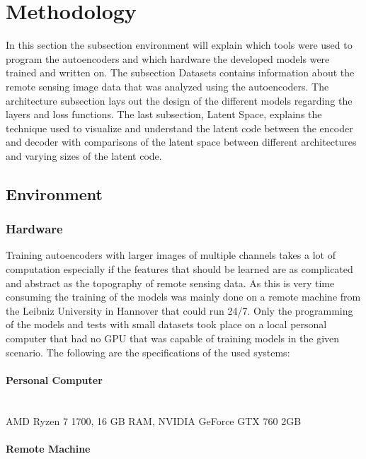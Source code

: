 \section{Methodology}

In this section the subsection environment will explain which tools were used to program the autoencoders
and which hardware the developed models were trained and written on. The subsection Datasets 
contains information about the remote sensing image data that was analyzed using the autoencoders. 
The architecture subsection lays out 
the design of the different models regarding the layers and loss functions. The last subsection, 
Latent Space, explains the technique used to visualize and understand the latent code between the 
encoder and decoder with comparisons of the latent space between different architectures and varying
sizes of the latent code.

\subsection{Environment}

\subsubsection{Hardware} \label{hardware}

Training autoencoders with larger images of multiple channels takes a lot of computation especially if the 
features that should be learned are as complicated and abstract as the topography of remote sensing data.
As this is very time consuming the training of the models was mainly done on a remote machine from the
Leibniz University in Hannover that could run 24/7. Only the
programming of the models and tests with small datasets took place on a local personal computer that had no
GPU that was capable of training models in the given scenario. The following
are the specifications of the used systems:\\

\paragraph{Personal Computer} \mbox{} \smallskip \\

AMD Ryzen 7 1700, 16 GB RAM, NVIDIA GeForce GTX 760 2GB

\paragraph{Remote Machine} \mbox{} \smallskip \\

